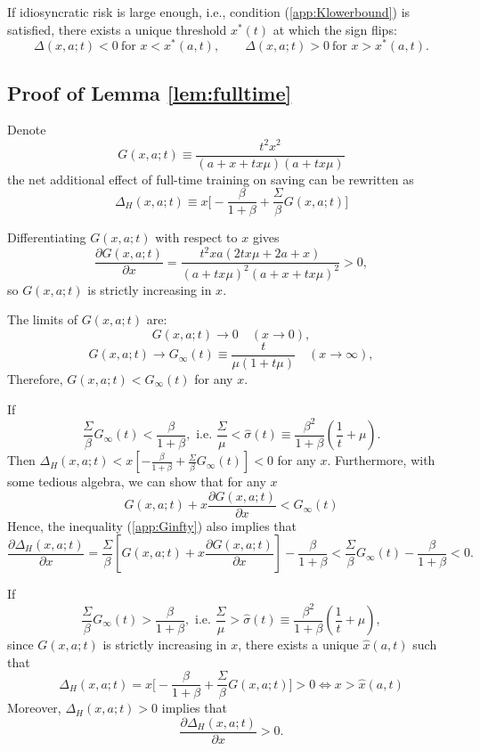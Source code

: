 \documentclass[12pt,english]{article}
\numberwithin{equation}{section}
\begin{document}
{If idiosyncratic risk is large enough, i.e., condition (\ref{app:Klowerbound}) is satisfied, there exists a unique threshold $x^\ast(t)$ at which the sign flips:
\[
    \Delta(x,a;t)<0\ \text{for }x<x^\ast(a,t),
\qquad
\Delta(x,a;t)>0\ \text{for }x>x^\ast(a,t).
\]



\subsection{Proof of Lemma \ref{lem:fulltime}}

Denote 
\[
G(x,a;t)\equiv \frac{t^2x^2}{(a+x+tx\mu)(a+tx\mu)}
\]
the net additional effect of full-time training on saving can be rewritten as 
\[
\Delta_H(x,a;t) \equiv  x\big[-\frac{\beta}{1+\beta} + \frac{\Sigma}{\beta}G(x,a;t)\big]
\]

Differentiating $G(x,a;t)$ with respect to $x$ gives
\[
\frac{\partial G(x,a;t)}{\partial x}
=
\frac{t^2xa(2tx\mu+2a+x)}{(a+ tx\mu)^2(a+x+tx\mu)^2}
>0,
\]
so $G(x,a;t)$ is strictly increasing in $x$.

The limits of $G(x,a;t)$ are:
\[
G(x,a;t) \to 0 \quad (x\to 0),
\]
\[
G(x,a;t) \to G_\infty(t)\equiv \frac{t}{\mu(1+t\mu)} \quad (x\to \infty),
\]
Therefore, $G(x,a;t)<G_\infty(t)$ for any $x$.

If 
\begin{equation} \label{app:Ginfty}
    \frac{\Sigma}{\beta}G_\infty(t)<\frac{\beta}{1+\beta}, \text{ i.e. } \frac{\Sigma}{\mu} < \hat{\sigma}(t) \equiv \frac{\beta^2}{1+\beta}(\frac{1}{t}+\mu).
\end{equation}
Then $\Delta_H(x,a;t)<x[-\frac{\beta}{1+\beta}+\frac{\Sigma}{\beta}G_\infty(t)]<0$ for any $x$. 
Furthermore, with some tedious algebra, we can show that for any $x$
\[
G(x,a;t)+x\frac{\partial G(x,a;t)}{\partial x}<G_\infty(t)
\]
Hence, the inequality (\ref{app:Ginfty}) also implies that
\begin{equation} 
    \frac{\partial \Delta_H(x,a;t)}{\partial x} = \frac{\Sigma}{\beta}[G(x,a;t)+x\frac{\partial G(x,a;t)}{\partial x}] - \frac{\beta}{1+\beta} < \frac{\Sigma}{\beta} G_\infty(t) - \frac{\beta}{1+\beta} < 0.
\end{equation}

If 
\begin{equation} \label{app:Ginfty2}
    \frac{\Sigma}{\beta}G_\infty(t)>\frac{\beta}{1+\beta}, \text{ i.e. } \frac{\Sigma}{\mu} > \hat{\sigma}(t) \equiv \frac{\beta^2}{1+\beta}(\frac{1}{t}+\mu),
\end{equation}
since $G(x,a;t)$ is strictly increasing in $x$, there exists a unique $\hat{x}(a,t)$ such that  
\[
\Delta_H(x,a;t) = x\big[-\frac{\beta}{1+\beta} + \frac{\Sigma}{\beta}G(x,a;t)\big]>0 \Leftrightarrow x>\hat{x}(a,t)
\]
Moreover, $\Delta_H(x,a;t)>0$ implies that
\[
\frac{\partial \Delta_H(x,a;t)}{\partial x} >0.
\]

}
\end{document}
